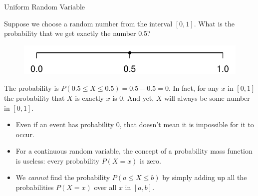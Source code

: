 \documentclass{beamer}
\begin{document}
\begin{frame}{Uniform Random Variable}
\begin{block}{}
Suppose we choose a random number from the interval $[0,1]$. What is the probability that we get exactly the number 0.5?
\end{block}
\pause \begin{figure}[H]
\includegraphics{ch4_interval2.pdf}
\end{figure}
\pause
The probability is 
$P(0.5 \leq X \leq 0.5) = 0.5 - 0.5 = 0$. In fact, for any $x$ in $[0,1]$ the probability that $X$ is exactly $x$ is 0. And yet, $X$ will always be some number in $[0,1]$. %

\begin{itemize}
\pause \item Even if an event has probability 0, that doesn't mean it is impossible for it to occur.
\pause \item For a continuous random variable, the concept of a probability mass function is useless: every probability $P(X=x)$ is zero. 
\pause \item We \textit{cannot} find the probability $P(a \leq X \leq b)$ by simply adding up all the probabilities $P(X=x)$ over all $x$ in $[a,b]$.
\end{itemize}
\end{frame}
\end{document}
